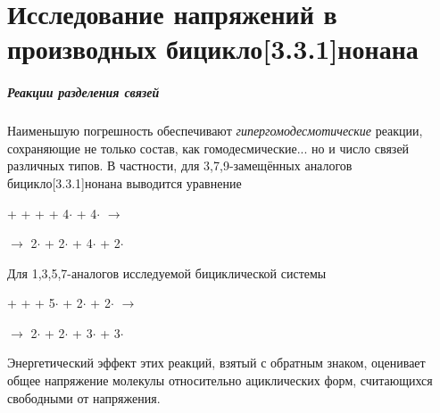 \chapter{Исследование напряжений в производных бицикло[3.3.1]нонана}\label{ch:Strain:331}

\paragraph{Реакции разделения связей} Наименьшую погрешность обеспечивают \emph{гипергомодесмотические} реакции, сохраняющие не только состав, как гомодесмические... но и число связей различных типов. В частности, для 3,7,9-замещённых аналогов бицикло[3.3.1]нонана выводится уравнение
\begin{center}
  +  +  +  + 4\(\cdot\) 
  + 4\(\cdot\)
  \(\longrightarrow\)
  
  \(\longrightarrow\) 
  2\(\cdot\) + 2\(\cdot\) + 4\(\cdot\) + 
  2\(\cdot\)
\end{center}

Для 1,3,5,7-аналогов исследуемой бициклической системы
\begin{center}
  +  +  + 5\(\cdot\) 
  + 2\(\cdot\)
  + 2\(\cdot\)
  \(\longrightarrow\)
  
  \(\longrightarrow\) 
  2\(\cdot\) + 2\(\cdot\) + 3\(\cdot\) + 3\(\cdot\)
\end{center}

Энергетический эффект этих реакций, взятый с обратным знаком, оценивает общее напряжение молекулы относительно ациклических форм, считающихся свободными от напряжения. 

